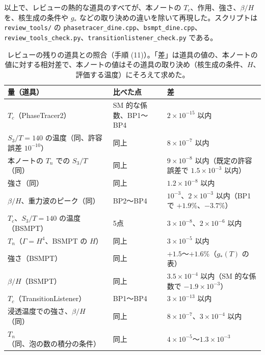 \documentclass[a4paper,10pt]{ltjsarticle}
\begin{document}
以上で、レビューの熱的な道具のすべてが、本ノートの $T_c$、作用、強さ、$\beta/H$ を、核生成の条件や $g_*$ などの取り決めの違いを除いて再現した。スクリプトは \texttt{review\_tools/} の \texttt{phasetracer\_dine.cpp}、\texttt{bsmpt\_dine.cpp}、\texttt{review\_tools\_check.py}、\texttt{transitionlistener\_check.py} である。

\begin{table}[tbp]
\centering\small
\caption{レビューの残りの道具との照合（手順 (11)）。「差」は道具の値の、本ノートの値に対する相対差で、本ノートの値はその道具の取り決め（核生成の条件、$H$、評価する温度）にそろえて求めた。}
\label{tab:tools2}
\begin{tabularx}{\linewidth}{>{\raggedright\arraybackslash}p{6.0cm}>{\raggedright\arraybackslash}X>{\raggedright\arraybackslash}p{4.6cm}}
\toprule
量（道具） & 比べた点 & 差 \\
\midrule
$T_c$（PhaseTracer2） & SM 的な係数、BP1〜BP4 & $2\times10^{-15}$ 以内 \\
$S_3/T=140$ の温度（同、許容誤差 $10^{-10}$） & 同上 & $8\times10^{-7}$ 以内 \\
本ノートの $T_n$ での $S_3/T$（同） & 同上 & $9\times10^{-8}$ 以内（既定の許容誤差で $1.5\times10^{-3}$ 以内） \\
強さ（同） & 同上 & $1.2\times10^{-8}$ 以内 \\
$\beta/H$、重力波のピーク（同） & BP2〜BP4 & $10^{-3}$、$2\times10^{-3}$ 以内（BP1 で $+1.9\%$、$-3.7\%$） \\
$T_c$、$S_3/T=140$ の温度（BSMPT） & 5点 & $3\times10^{-8}$、$2\times10^{-6}$ 以内 \\
$T_n$（$\Gamma=H^4$、BSMPT の $H$） & 同上 & $3\times10^{-5}$ 以内 \\
強さ（BSMPT） & 同上 & $+1.5$〜$+1.6\%$（$g_*(T)$ の表） \\
$\beta/H$（BSMPT） & 同上 & $3.5\times10^{-4}$ 以内（SM 的な係数で $-1.9\times10^{-3}$） \\
$T_c$（TransitionListener） & BP1〜BP4 & $3\times10^{-13}$ 以内 \\
浸透温度での強さ、$\beta/H$（同） & 同上 & $8\times10^{-7}$、$3\times10^{-4}$ 以内 \\
$T_n$（同、泡の数の積分の条件） & 同上 & $4\times10^{-5}$〜$1.3\times10^{-3}$ \\
\bottomrule
\end{tabularx}
\end{table}
\end{document}
